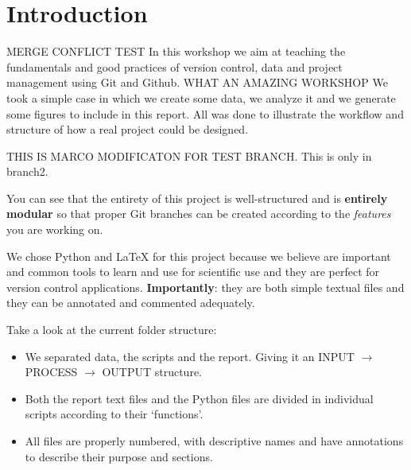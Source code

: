 \section{Introduction}

MERGE CONFLICT TEST In this workshop we aim at teaching the fundamentals and good practices of version control, data and project management using Git and Github. WHAT AN AMAZING WORKSHOP We took a simple case in which we create some data, we analyze it and we generate some figures to include in this report. All was done to illustrate the workflow and structure of how a real project could be designed.

THIS IS MARCO MODIFICATON FOR TEST BRANCH. This is only in branch2.

You can see that the entirety of this project is well-structured and is \textbf{entirely modular} so that proper Git branches can be created according to the \textit{features} you are working on.

We chose Python and \LaTeX\xspace for this project because we believe are important and common tools to learn and use for scientific use and they are perfect for version control applications. \textbf{Importantly}: they are both simple textual files and they can be annotated and commented adequately.

Take a look at the current folder structure:

\begin{itemize}
    \item We separated data, the scripts and the report. Giving it an INPUT $\rightarrow$ PROCESS $\rightarrow$ OUTPUT structure.
    \item Both the report text files and the Python files are divided in individual scripts according to their `functions'.
    \item All files are properly numbered, with descriptive names and have annotations to describe their purpose and sections.
\end{itemize}

